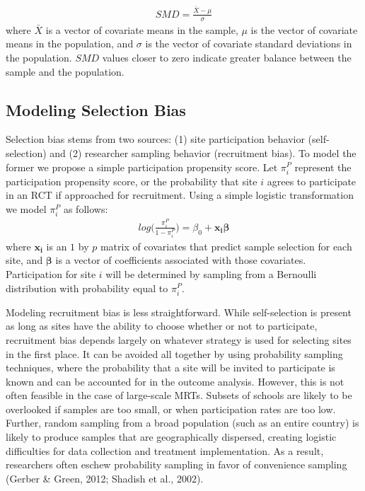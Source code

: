 \documentclass[man,floatsintext]{apa6}
\begin{document}
\begin{align} \label{eq:SMD}
SMD = \frac{\bar{X}-\mu}{\sigma}
\end{align}
where \(\bar{X}\) is a vector of covariate means in the sample, \(\mu\) is the vector of covariate means in the population, and \(\sigma\) is the vector of covariate standard deviations in the population. \(SMD\) values closer to zero indicate greater balance between the sample and the population.

\hypertarget{modeling-selection-bias}{%
\subsection{Modeling Selection Bias}\label{modeling-selection-bias}}

Selection bias stems from two sources: (1) site participation behavior (self-selection) and (2) researcher sampling behavior (recruitment bias). To model the former we propose a simple participation propensity score. Let \(\pi^P_i\) represent the participation propensity score, or the probability that site \(i\) agrees to participate in an RCT if approached for recruitment. Using a simple logistic transformation we model \(\pi^P_i\) as follows:
\begin{align} 
\label{eq:RGM}
log\bigg(\frac{\pi^P_i}{1 - \pi^P_i}\bigg) = \beta_0 + \boldsymbol{x_i \beta}
\end{align}
where \(\boldsymbol{x_i}\) is an \(1\) by \(p\) matrix of covariates that predict sample selection for each site, and \(\boldsymbol{\beta}\) is a vector of coefficients associated with those covariates. Participation for site \(i\) will be determined by sampling from a Bernoulli distribution with probability equal to \(\pi^P_i\).

Modeling recruitment bias is less straightforward. While self-selection is present as long as sites have the ability to choose whether or not to participate, recruitment bias depends largely on whatever strategy is used for selecting sites in the first place. It can be avoided all together by using probability sampling techniques, where the probability that a site will be invited to participate is known and can be accounted for in the outcome analysis. However, this is not often feasible in the case of large-scale MRTs. Subsets of schools are likely to be overlooked if samples are too small, or when participation rates are too low. Further, random sampling from a broad population (such as an entire country) is likely to produce samples that are geographically dispersed, creating logistic difficulties for data collection and treatment implementation. As a result, researchers often eschew probability sampling in favor of convenience sampling (Gerber \& Green, 2012; Shadish et al., 2002).
\end{document}
